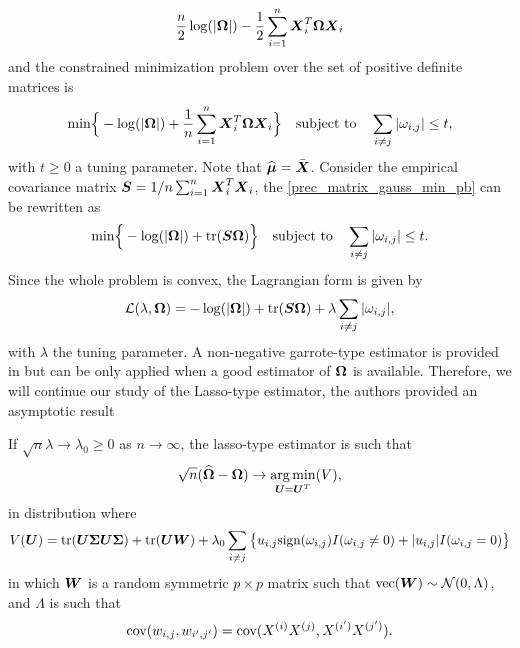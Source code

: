 \begin{equation}
  \frac{n}{2}\log(|\boldsymbol\Omega|) - \frac{1}{2}\sum_{i=1}^n\boldsymbol X_i^T\boldsymbol\Omega\boldsymbol X_i
\end{equation}
and the constrained minimization problem over the set of positive definite matrices is
\begin{equation}
\label{prec_matrix_gauss_min_pb}
  \text{min}\Big\{-\log(|\boldsymbol\Omega|) + \frac{1}{n}\sum_{i=1}^n\boldsymbol X_i^T\boldsymbol\Omega\boldsymbol X_i\Big\} \quad \text{subject to}\quad \sum_{i\neq j} |\omega_{i,j}|\leq t,
\end{equation}
with $t\geq 0$ a tuning parameter. Note that $\widehat{\boldsymbol\mu}=\bar{\boldsymbol X}$. Consider the empirical covariance matrix $\boldsymbol S=1/n\sum_{i=1}^n\boldsymbol X_i^T\boldsymbol X_i$, the \cref{prec_matrix_gauss_min_pb} can be rewritten as 
\begin{equation}
  \text{min}\Big\{-\log(|\boldsymbol\Omega|) + \text{tr}(\boldsymbol S\boldsymbol\Omega)\Big\} \quad \text{subject to}\quad \sum_{i\neq j} |\omega_{i,j}|\leq t.
\end{equation}
Since the whole problem is convex, the Lagrangian form is given by
\begin{equation}
\label{yuan_lkhood_pb}
  \mathcal L (\lambda, \boldsymbol\Omega) = -\log(|\boldsymbol\Omega|) + \text{tr}(\boldsymbol S\boldsymbol\Omega) + \lambda\sum_{i\neq j} |\omega_{i,j}|,
\end{equation}
with $\lambda$ the tuning parameter. A non-negative garrote-type estimator is provided in \citep{yuanLin_graph} but can be only applied when a good estimator of $\boldsymbol\Omega$ is available. Therefore, we will continue our study of the Lasso-type estimator, the authors provided an asymptotic result
\begin{theorem}
If $\sqrt{n}\lambda \rightarrow \lambda_0\geq0$  as $n\rightarrow\infty$, the lasso-type estimator is such that 
\begin{equation*}
  \sqrt{n}(\widehat{\boldsymbol\Omega}-\boldsymbol\Omega)\rightarrow\operatorname*{arg\,min}_{\boldsymbol U=\boldsymbol U^T}(V),
\end{equation*}
in distribution where
\begin{equation*}
  V(\boldsymbol U)=\textnormal{tr}(\boldsymbol U \boldsymbol\Sigma \boldsymbol U \boldsymbol\Sigma)+\textnormal{tr}(\boldsymbol U \boldsymbol W)+\lambda_0\sum_{i\neq j}\big\{ u_{i,j}\textnormal{sign}(\omega_{i,j})I(\omega_{i,j}\neq 0)+|u_{i,j}|I(\omega_{i,j} =0) \big\}
\end{equation*}
in which $\boldsymbol W$ is a random symmetric $p\times p$ matrix such that $\textnormal{vec}(\boldsymbol W) \sim \mathcal N (0, \Lambda)$, and  $\Lambda$ is such that
\begin{equation*}
  \textnormal{cov}(w_{i,j},w_{i',j'}) = \textnormal{cov}(X^{(i)}X^{(j)},X^{(i')}X^{(j')}).
\end{equation*}
\end{theorem}
